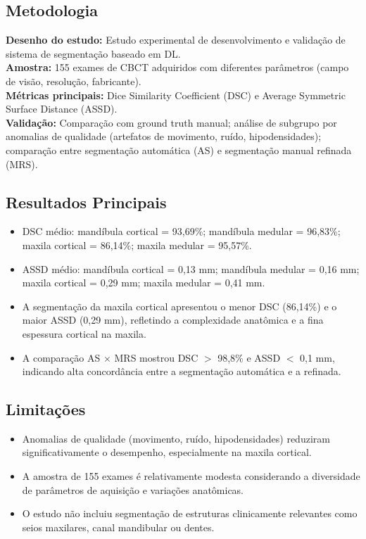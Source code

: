 \subsection{Metodologia}
\textbf{Desenho do estudo:} Estudo experimental de desenvolvimento e validação
de sistema de segmentação baseado em DL. \\
\textbf{Amostra:} 155 exames de CBCT adquiridos com diferentes parâmetros
(campo de visão, resolução, fabricante). \\
\textbf{Métricas principais:} Dice Similarity Coefficient (DSC) e Average
Symmetric Surface Distance (ASSD). \\
\textbf{Validação:} Comparação com ground truth manual; análise de subgrupo por
anomalias de qualidade (artefatos de movimento, ruído, hipodensidades);
comparação entre segmentação automática (AS) e segmentação manual refinada (MRS).

\subsection{Resultados Principais}
\begin{itemize}
  \item DSC médio: mandíbula cortical = 93,69\%; mandíbula medular = 96,83\%;
        maxila cortical = 86,14\%; maxila medular = 95,57\%.
  \item ASSD médio: mandíbula cortical = 0,13 mm; mandíbula medular = 0,16 mm;
        maxila cortical = 0,29 mm; maxila medular = 0,41 mm.
  \item A segmentação da maxila cortical apresentou o menor DSC (86,14\%) e o
        maior ASSD (0,29 mm), refletindo a complexidade anatômica e a fina
        espessura cortical na maxila.
  \item A comparação AS $\times$ MRS mostrou DSC $>$ 98,8\% e ASSD $<$ 0,1 mm,
        indicando alta concordância entre a segmentação automática e a refinada.
\end{itemize}

\subsection{Limitações}
\begin{itemize}
  \item Anomalias de qualidade (movimento, ruído, hipodensidades) reduziram
        significativamente o desempenho, especialmente na maxila cortical.
  \item A amostra de 155 exames é relativamente modesta considerando a
        diversidade de parâmetros de aquisição e variações anatômicas.
  \item O estudo não incluiu segmentação de estruturas clinicamente relevantes
        como seios maxilares, canal mandibular ou dentes.
\end{itemize}

